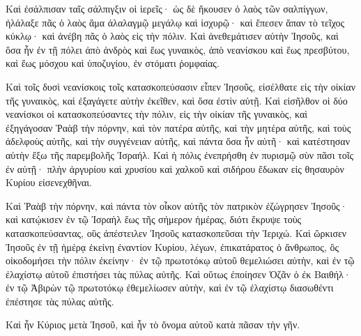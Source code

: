 {\par }{\PP {}Καὶ ἐσάλπισαν ταῖς σάλπιγξιν οἱ ἱερεῖς· ὡς δὲ ἤκουσεν ὁ λαὸς τῶν σαλπίγγων, ἠλάλαξε πᾶς ὁ λαὸς ἅμα ἀλαλαγμῷ μεγάλῳ καὶ ἰσχυρῷ· καὶ ἔπεσεν ἅπαν τὸ τεῖχος κύκλῳ· καὶ ἀνέβη πᾶς ὁ λαὸς εἰς τὴν πόλιν.
Καὶ ἀνεθεμάτισεν αὐτὴν Ἰησοῦς, καὶ ὅσα ἦν ἐν τῇ πόλει ἀπὸ ἀνδρὸς καὶ ἕως γυναικὸς, ἀπὸ νεανίσκου καὶ ἕως πρεσβύτου, καὶ ἕως μόσχου καὶ ὑποζυγίου, ἐν στόματι ῥομφαίας.
\par }{\PP {}Καὶ τοῖς δυσὶ νεανίσκοις τοῖς κατασκοπεύσασιν εἶπεν Ἰησοῦς, εἰσέλθατε εἰς τὴν οἰκίαν τῆς γυναικὸς, καὶ ἐξαγάγετε αὐτὴν ἐκεῖθεν, καὶ ὅσα ἐστὶν αὐτῇ.
Καὶ εἰσῆλθον οἱ δύο νεανίσκοι οἱ κατασκοπεύσαντες τὴν πόλιν, εἰς τὴν οἰκίαν τῆς γυναικὸς, καὶ ἐξηγάγοσαν Ῥαὰβ τὴν πόρνην, καὶ τὸν πατέρα αὐτῆς, καὶ τὴν μητέρα αὐτῆς, καὶ τοὺς ἀδελφοὺς αὐτῆς, καὶ τὴν συγγένειαν αὐτῆς, καὶ πάντα ὅσα ἦν αὐτῆ· καὶ κατέστησαν αὐτὴν ἔξω τῆς παρεμβολῆς Ἰσραήλ.
Καὶ ἡ πόλις ἐνεπρήσθη ἐν πυρισμῷ σὺν πᾶσι τοῖς ἐν αὐτῇ· πλὴν ἀργυρίου καὶ χρυσίου καὶ χαλκοῦ καὶ σιδήρου ἔδωκαν εἰς θησαυρὸν Κυρίου εἰσενεχθῆναι.
\par }{\PP {}Καὶ Ῥαὰβ τὴν πόρνην, καὶ πάντα τὸν οἶκον αὐτῆς τὸν πατρικὸν ἐζώγρησεν Ἰησοῦς· καὶ κατῴκισεν ἐν τῷ Ἰσραὴλ ἕως τῆς σήμερον ἡμέρας, διότι ἔκρυψε τοὺς κατασκοπεύσαντας, οὓς ἀπέστειλεν Ἰησοῦς κατασκοπεῦσαι τὴν Ἱεριχώ.
Καὶ ὥρκισεν Ἰησοῦς ἐν τῇ ἡμέρᾳ ἐκείνῃ ἐναντίον Κυρίου, λέγων, ἐπικατάρατος ὁ ἄνθρωπος, ὃς οἰκοδομήσει τὴν πόλιν ἐκείνην· ἐν τῷ πρωτοτόκῳ αὐτοῦ θεμελιώσει αὐτὴν, καὶ ἐν τῷ ἐλαχίστῳ αὐτοῦ ἐπιστήσει τὰς πύλας αὐτῆς. Καὶ οὕτως ἐποίησεν Ὁζᾶν ὁ ἐκ Βαιθήλ· ἐν τῷ Ἀβιρὼν τῷ πρωτοτόκῳ ἐθεμελίωσεν αὐτὴν, καὶ ἐν τῷ ἐλαχίστῳ διασωθέντι ἐπέστησε τὰς πύλας αὐτῆς.
\par }{\PP {}Καὶ ἦν Κύριος μετὰ Ἰησοῦ, καὶ ἦν τὸ ὄνομα αὐτοῦ κατὰ πᾶσαν τὴν γῆν.

}

